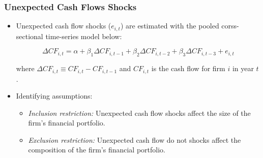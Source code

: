 \documentclass[handout]{beamer}
\begin{document}
\begin{frame}[label=unexpected]
\frametitle{Unexpected Cash Flows Shocks}
\begin{itemize}

\item Unexpected cash flow shocks ($e_{i,t}$) are estimated with the pooled corss-sectional time-series model below:

$$
\Delta CF_{i,t}
= \alpha + \beta_1 \Delta CF_{i,t-1} + \beta_2 \Delta CF_{i,t-2} + \beta_3 \Delta CF_{i,t-3} + e_{i,t}
$$

where $\Delta CF_{i,t} \equiv CF_{i,t} - CF_{i,t-1}$ and $CF_{i,t}$ is the cash flow for firm $i$ in year $t$.

\item Identifying assumptions:

\begin{itemize}

\item \textit{Inclusion restriction:} Unexpected cash flow shocks affect the size of the firm's financial portfolio.
\item \textit{Exclusion restriction:} Unexpected cash flow do not shocks affect the composition of the firm's financial portfolio.



\end{itemize}

\end{itemize}
\hyperlink{endogeneity}{}
\end{frame}
\end{document}
